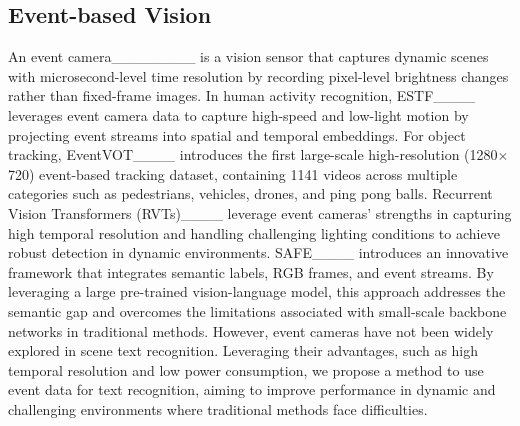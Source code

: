 \subsection{Event-based Vision}  
An event camera________ is a vision sensor that captures dynamic scenes with microsecond-level time resolution by recording pixel-level brightness changes rather than fixed-frame images. 
In human activity recognition, ESTF____ leverages event camera data to capture high-speed and low-light motion by projecting event streams into spatial and temporal embeddings. 
For object tracking, EventVOT____ introduces the first large-scale high-resolution (1280$\times$720) event-based tracking dataset, containing 1141 videos across multiple categories such as pedestrians, vehicles, drones, and ping pong balls. 
Recurrent Vision Transformers (RVTs)____ leverage event cameras' strengths in capturing high temporal resolution and handling challenging lighting conditions to achieve robust detection in dynamic environments. 
SAFE____ introduces an innovative framework that integrates semantic labels, RGB frames, and event streams. By leveraging a large pre-trained vision-language model, this approach addresses the semantic gap and overcomes the limitations associated with small-scale backbone networks in traditional methods. However, event cameras have not been widely explored in scene text recognition. Leveraging their advantages, such as high temporal resolution and low power consumption, we propose a method to use event data for text recognition, aiming to improve performance in dynamic and challenging environments where traditional methods face difficulties.